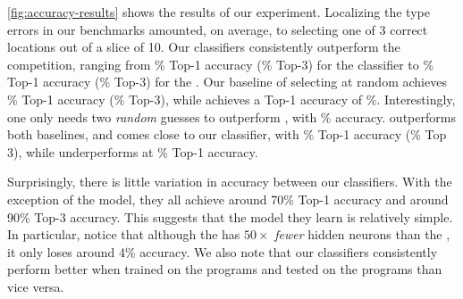 \autoref{fig:accuracy-results} shows the results of our experiment.
%
Localizing the type errors in our benchmarks amounted, on average, to
selecting one of 3 correct locations out of a slice of 10.
%
Our classifiers consistently outperform the competition, ranging from
\LinearTopOne\% Top-1 accuracy (\LinearTopThree\% Top-3)
for the \linear classifier to
\HiddenFhTopOne\% Top-1 accuracy (\HiddenFhTopThree\% Top-3)
for the \hiddenFH.\@
%
Our baseline of selecting at random achieves \BaselineTopOne\% Top-1
accuracy (\BaselineTopThree\% Top-3),
while \ocaml achieves a Top-1 accuracy of \OcamlTopOne\%.
%
Interestingly, one only needs two \emph{random} guesses to outperform
\ocaml, with \BaselineTopTwo\% accuracy.
%
\sherrloc outperforms both baselines, and comes close to our \linear classifier,
with \SherrlocTopOne\% Top-1 accuracy (\SherrlocTopThree\% Top 3),
while \mycroft underperforms \ocaml at \MycroftTopOne\% Top-1 accuracy.
%

Surprisingly, there is little variation in accuracy between our
classifiers.
%
With the exception of the \linear model, they all achieve around 70\%
Top-1 accuracy and around 90\% Top-3 accuracy.
%
This suggests that the model they learn is relatively simple.
%
In particular, notice that although the \hiddenT has $50\times$ \emph{fewer}
hidden neurons than the \hiddenFH, it only loses around 4\% accuracy.
%
We also note that our classifiers consistently perform better when
trained on the \FALL programs and tested on the \SPRING programs than
vice versa.
